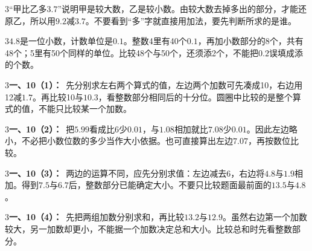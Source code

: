 \documentclass[multi=snippet,border={5bp 20bp 5bp 5bp}]{standalone}
\newenvironment{snippet}[3]{\begin{minipage}{#1bp}\color{answerred}\fontsize{#2}{#3}\selectfont\raggedright}{\end{minipage}}
\begin{document}
\begin{snippet}{505}{11.5}{14}\begin{multicols}{3}\raggedcolumns “甲比乙多\(3.7\)\allowbreak ”说明甲是较大数，乙是较小数。由较大数去掉多出的部分，才能还原乙，所以用\(9.2\)\allowbreak 减\(3.7\)\allowbreak 。不要看到“多”字就直接用加法，要先判断所求的是谁。\end{multicols}\end{snippet}
\begin{snippet}{505}{11.5}{14}\begin{multicols}{3}\raggedcolumns \(4.8\)\allowbreak 是一位小数，计数单位是\(0.1\)\allowbreak 。整数4里有40个\(0.1\)\allowbreak ，再加小数部分的8个，共有48个；5里有50个同样的单位。比较48个与50个，还须添2个，不能把\(0.2\)\allowbreak 误填成添的个数。\end{multicols}\end{snippet}
\begin{snippet}{505}{11.5}{14}\begin{multicols}{3}\raggedcolumns \textbf{一、10（1）：}\ 先分别求左右两个算式的值，左边两个加数可先凑成10，右边用12减\(1.7\)\allowbreak 。再比较10与\(10.3\)\allowbreak ，看整数部分相同后的十分位。圆圈中比较的是整个算式的值，不能只比较某一个加数。\end{multicols}\end{snippet}
\begin{snippet}{505}{11.5}{14}\begin{multicols}{3}\raggedcolumns \textbf{一、10（2）：}\ 把\(5.99\)\allowbreak 看成比6少\(0.01\)\allowbreak ，与\(1.08\)\allowbreak 相加就比\(7.08\)\allowbreak 少\(0.01\)\allowbreak 。因此左边略小，不必把小数位数的多少当作大小依据。也可直接算出左边\(7.07\)\allowbreak ，再按数位比较。\end{multicols}\end{snippet}
\begin{snippet}{505}{11.5}{14}\begin{multicols}{3}\raggedcolumns \textbf{一、10（3）：}\ 两边的运算不同，应先分别求值：左边减去6，右边将\(4.8\)\allowbreak 与\(1.9\)\allowbreak 相加。得到\(7.5\)\allowbreak 与\(6.7\)\allowbreak 后，整数部分已能确定大小。不要只比较题面最前面的\(13.5\)\allowbreak 与\(4.8\)\allowbreak 。\end{multicols}\end{snippet}
\begin{snippet}{505}{11.5}{14}\begin{multicols}{3}\raggedcolumns \textbf{一、10（4）：}\ 先把两组加数分别求和，再比较\(13.2\)\allowbreak 与\(12.9\)\allowbreak 。虽然右边第一个加数较大，另一加数却更小，不能据一个加数决定总和大小。比较总和时先看整数部分。\end{multicols}\end{snippet}
\end{document}
